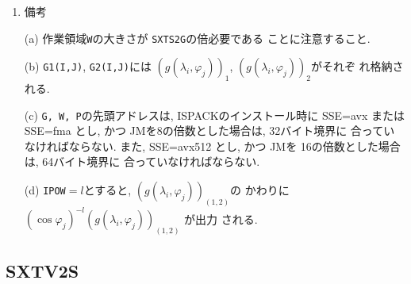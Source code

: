 \documentclass[a4j]{jsarticle}
\begin{document}
\begin{enumerate}
\item 備考

(a) 作業領域\texttt{W}の大きさが \texttt{SXTS2G}の倍必要である
      ことに注意すること.

(b) \texttt{G1(I,J)}, \texttt{G2(I,J)}には
    $(g(\lambda_i,\varphi_j))_1$, $(g(\lambda_i,\varphi_j))_2$がそれぞ
  れ格納される.

(c) \texttt{G, W, P}の先頭アドレスは, 
ISPACKのインストール時に SSE=avx または SSE=fma とし, かつ
JMを8の倍数とした場合は, 32バイト境界に
合っていなければならない.
また, SSE=avx512 とし, かつ
JMを 16の倍数とした場合は, 64バイト境界に
合っていなければならない.

(d) \texttt{IPOW}$=l$とすると, $(g(\lambda_i,\varphi_j))_{(1,2)}$の
    かわりに $(\cos\varphi_j)^{-l}(g(\lambda_i,\varphi_j))_{(1,2)}$ が出力
    される.

\end{enumerate}


\subsection{SXTV2S}
\end{document}
